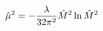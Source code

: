 \begin{equation}\label{ventuno}
\hat  \mu ^2 =  - {\lambda \over 32 \pi ^ 2} \hat  M^2 \ln { \hat M^2}
\end{equation}

